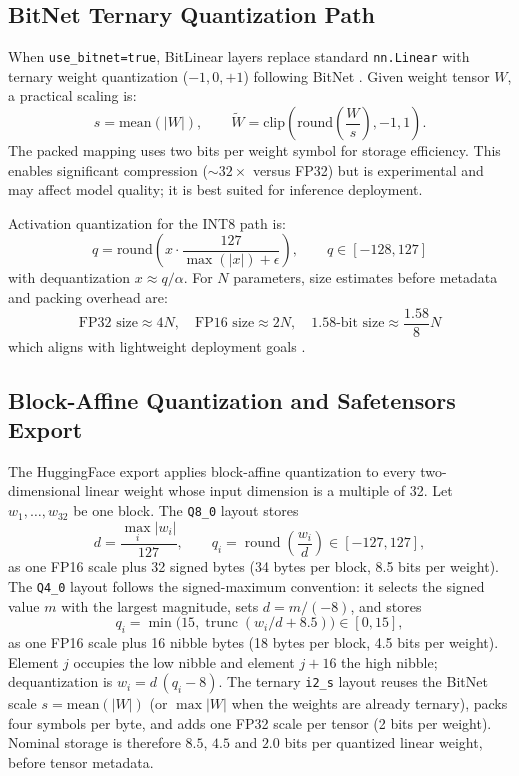 \subsection{BitNet Ternary Quantization Path}

When \texttt{use\_bitnet=true}, BitLinear layers replace standard \texttt{nn.Linear} with ternary weight quantization ($-1, 0, +1$) following BitNet \citep{wang_bitnet_2023}. Given weight tensor $W$, a practical scaling is:
\[
s=\text{mean}(|W|),\qquad
\tilde{W}=\text{clip}\left(\text{round}\left(\frac{W}{s}\right),-1,1\right).
\]
The packed mapping uses two bits per weight symbol for storage efficiency. This enables significant compression ($\sim 32\times$ versus FP32) but is experimental and may affect model quality; it is best suited for inference deployment.

Activation quantization for the INT8 path is:
\[
q=\text{round}\left(x\cdot\frac{127}{\max(|x|)+\epsilon}\right),\qquad q\in[-128,127]
\]
with dequantization $x\approx q/\alpha$. For $N$ parameters, size estimates before metadata and packing overhead are:
\[
\text{FP32 size}\approx 4N,\quad \text{FP16 size}\approx 2N,\quad \text{1.58-bit size}\approx \frac{1.58}{8}N
\]
which aligns with lightweight deployment goals \citep{samson_lightweight_2026,bravin_embbert_2026}.

\subsection{Block-Affine Quantization and Safetensors Export}
\label{sec:annex-block-affine}

The HuggingFace export applies block-affine quantization to every two-dimensional linear weight whose input dimension is a multiple of 32. Let $w_1,\ldots,w_{32}$ be one block. The \texttt{Q8\_0} layout stores
\[
d=\frac{\max_i |w_i|}{127},\qquad q_i=\operatorname{round}\!\left(\frac{w_i}{d}\right)\in[-127,127],
\]
as one FP16 scale plus 32 signed bytes (34 bytes per block, 8.5 bits per weight). The \texttt{Q4\_0} layout follows the signed-maximum convention: it selects the signed value $m$ with the largest magnitude, sets $d=m/(-8)$, and stores
\[
q_i=\min\!\bigl(15,\operatorname{trunc}(w_i/d+8.5)\bigr)\in[0,15],
\]
as one FP16 scale plus 16 nibble bytes (18 bytes per block, 4.5 bits per weight). Element $j$ occupies the low nibble and element $j+16$ the high nibble; dequantization is $\hat w_i=d\,(q_i-8)$. The ternary \texttt{i2\_s} layout reuses the BitNet scale $s=\text{mean}(|W|)$ (or $\max|W|$ when the weights are already ternary), packs four symbols per byte, and adds one FP32 scale per tensor (2 bits per weight). Nominal storage is therefore $8.5$, $4.5$ and $2.0$ bits per quantized linear weight, before tensor metadata.

